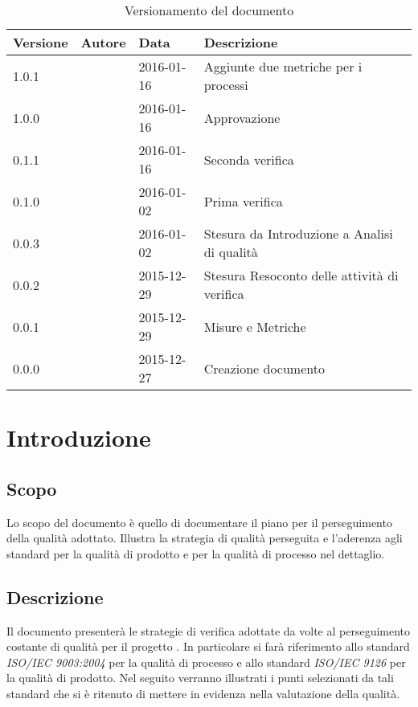 \documentclass[12pt,a4paper]{article}
\begin{document}
\begin{table}[h]
\begin{center}

\begin{tabular}{p{} p{} p{} p{}}
\toprule
\textbf{Versione}	&	\textbf{Autore}	&	\textbf{Data}	&	\textbf{Descrizione}\\
\midrule
\midrule
1.0.1 & \AVI{} & 2016-01-16 & Aggiunte due metriche per i processi \\
\midrule
1.0.0 & \IB{} & 2016-01-16 & Approvazione \\
\midrule
0.1.1 & \AVE{} & 2016-01-16 & Seconda verifica \\
\midrule
0.1.0 & \NDC{} & 2016-01-02 & Prima verifica \\
\midrule
0.0.3 & \AB{} & 2016-01-02 &  Stesura da Introduzione a Analisi di qualità\\
\midrule
0.0.2 & \WS{} & 2015-12-29 &  Stesura Resoconto delle attività di verifica\\
\midrule
0.0.1 & \AVI{} & 2015-12-29 &  Misure e Metriche \\
\midrule
0.0.0 & \IB{} & 2015-12-27 &  Creazione documento \\
\bottomrule
\end{tabular}
\caption{Versionamento del documento}
\label{tabVers1}
\end{center}
\end{table}

\newpage
\tableofcontents
\newpage

\listoftables
\listoffigures
\newpage

\section{Introduzione}
\subsection{Scopo}
Lo scopo del documento è quello di documentare il piano per il perseguimento della qualità adottato. Illustra la strategia di qualità perseguita e l'aderenza agli standard per la qualità di prodotto e per la qualità di processo nel dettaglio. 

\subsection{Descrizione}
Il documento presenterà  le strategie di verifica adottate da \nomeGruppo{} volte al
perseguimento costante di  qualità per il progetto \prjL{}.
In particolare si farà riferimento allo standard \textit{ISO/IEC 9003:2004} per la qualità di processo e allo standard \textit{ISO/IEC 9126} per la qualità di prodotto. Nel seguito verranno illustrati i punti selezionati da tali standard che si è ritenuto di mettere in evidenza nella valutazione della qualità.
\end{document}
